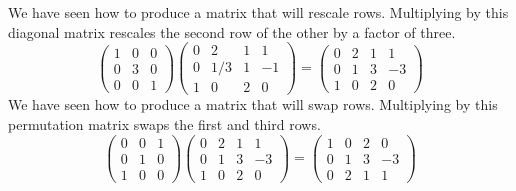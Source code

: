 \begin{example}
We have seen how to produce a matrix that will rescale rows.
Multiplying by this diagonal matrix rescales the second row of
the other by a factor of three.
\begin{equation*}
    \begin{pmatrix}
      1  &0  &0  \\
      0  &3  &0  \\
      0  &0  &1
    \end{pmatrix}
    \begin{pmatrix}
      0  &2    &1  &1  \\
      0  &1/3  &1  &-1 \\
      1  &0    &2  &0
    \end{pmatrix}
  =
    \begin{pmatrix}
      0  &2    &1  &1  \\
      0  &1    &3  &-3 \\
      1  &0    &2  &0
    \end{pmatrix}
\end{equation*}
We have seen how to produce a matrix that will swap rows.
Multiplying by this permutation matrix swaps the 
first and third rows.
\begin{equation*}
    \begin{pmatrix}
      0  &0  &1  \\
      0  &1  &0  \\
      1  &0  &0
    \end{pmatrix}
    \begin{pmatrix}
      0  &2    &1  &1  \\
      0  &1    &3  &-3 \\
      1  &0    &2  &0
    \end{pmatrix}
  =
    \begin{pmatrix}
      1  &0    &2  &0  \\
      0  &1    &3  &-3 \\
      0  &2    &1  &1
    \end{pmatrix}
\end{equation*}
\end{example}

